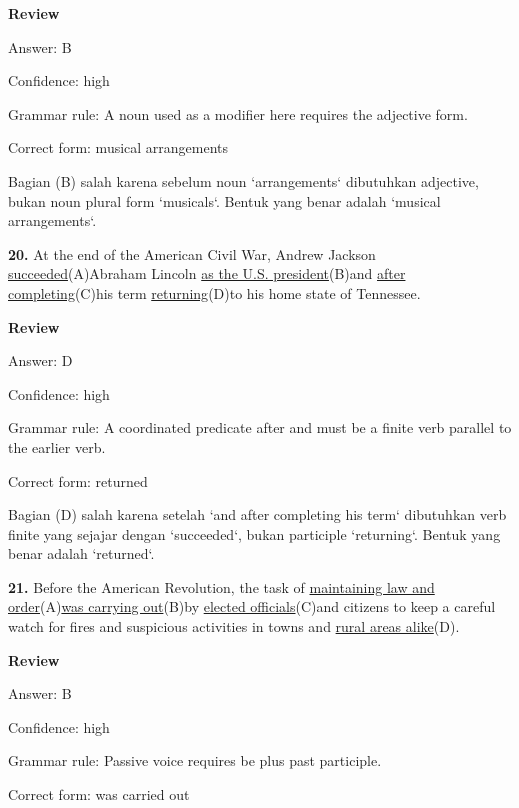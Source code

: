 \documentclass[12pt]{article}
\begin{document}
\par
\begingroup
\setlength{\parskip}{0pt}
\setlength{\parindent}{0pt}
\textbf{Review}\par
Answer: B\par
Confidence: high\par
Grammar rule: A noun used as a modifier here requires the adjective form.\par
Correct form: musical arrangements\par
Bagian (B) salah karena sebelum noun `arrangements` dibutuhkan adjective, bukan noun  plural form `musicals`. Bentuk yang benar adalah `musical arrangements`.\par
\endgroup
\par
\vspace{\questionblockgap}
\noindent\textbf{20.} At the end of the American Civil War, Andrew Jackson \uline{succeeded}(A)Abraham Lincoln \uline{as the U.S. president}(B)and \uline{after completing}(C)his term \uline{returning}(D)to his home state of Tennessee.
\par
\begingroup
\setlength{\parskip}{0pt}
\setlength{\parindent}{0pt}
\textbf{Review}\par
Answer: D\par
Confidence: high\par
Grammar rule: A coordinated predicate after and must be a finite verb parallel to the earlier verb.\par
Correct form: returned\par
Bagian (D) salah karena setelah `and after completing his term` dibutuhkan verb finite yang sejajar dengan `succeeded`, bukan participle `returning`. Bentuk yang benar adalah `returned`.\par
\endgroup
\par
\vspace{\questionblockgap}
\noindent\textbf{21.} Before the American Revolution, the task of \uline{maintaining law and order}(A)\uline{was carrying out}(B)by \uline{elected officials}(C)and citizens to keep a careful watch for fires and suspicious activities in towns and \uline{rural areas alike}(D).
\par
\begingroup
\setlength{\parskip}{0pt}
\setlength{\parindent}{0pt}
\textbf{Review}\par
Answer: B\par
Confidence: high\par
Grammar rule: Passive voice requires be plus past participle.\par
Correct form: was carried out\par
\end{document}
